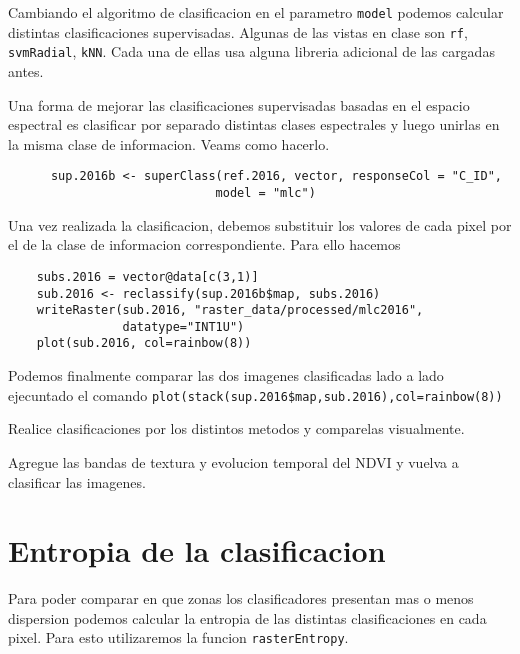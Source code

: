 Cambiando el algoritmo de clasificacion en el parametro \texttt{model} podemos
calcular distintas clasificaciones supervisadas. Algunas de las vistas en clase
son \texttt{rf}, \texttt{svmRadial}, \texttt{kNN}. Cada una de ellas usa alguna
libreria adicional de las cargadas antes.

\begin{exa}
  Una forma de mejorar las clasificaciones supervisadas basadas en el espacio
  espectral es clasificar por separado distintas clases espectrales y luego unirlas
  en la misma clase de informacion. Veams como hacerlo.
  \begin{lstlisting}
      sup.2016b <- superClass(ref.2016, vector, responseCol = "C_ID",
                             model = "mlc")
  \end{lstlisting}

  Una vez realizada la clasificacion, debemos substituir los valores de cada pixel
  por el de la clase de informacion correspondiente. Para ello hacemos

  \begin{lstlisting}
    subs.2016 = vector@data[c(3,1)]
    sub.2016 <- reclassify(sup.2016b$map, subs.2016)
    writeRaster(sub.2016, "raster_data/processed/mlc2016",
                datatype="INT1U")
    plot(sub.2016, col=rainbow(8))
  \end{lstlisting}


    Podemos finalmente comparar las dos imagenes clasificadas lado a lado ejecuntado el
    comando \verb|plot(stack(sup.2016$map,sub.2016),col=rainbow(8))|
\end{exa}

\begin{act}
    Realice clasificaciones por los distintos metodos y comparelas visualmente.
\end{act}

\begin{act}
    Agregue las bandas de textura y evolucion temporal del NDVI y vuelva a clasificar
    las imagenes.
\end{act}

\section{Entropia de la clasificacion}

Para poder comparar en que zonas los clasificadores presentan mas o menos
dispersion podemos calcular la entropia de las distintas clasificaciones en cada
pixel. Para esto utilizaremos la funcion \texttt{rasterEntropy}.

